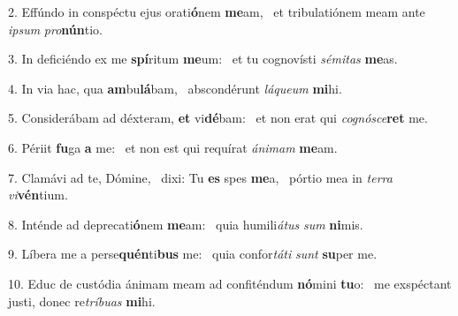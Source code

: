 2. Effúndo in conspéctu ejus orati\textbf{ó}nem \textbf{me}am, \ast\  et tribulatiónem meam ante \textit{ip}\textit{sum} \textit{pro}\textbf{nún}tio.\

3. In deficiéndo ex me \textbf{spí}ritum \textbf{me}um: \ast\  et tu cognovísti \textit{sé}\textit{mi}\textit{tas} \textbf{me}as.\

4. In via hac, qua \textbf{am}bu\textbf{lá}bam, \ast\  abscondérunt \textit{lá}\textit{que}\textit{um} \textbf{mi}hi.\

5. Considerábam ad déxteram, \textbf{et} vi\textbf{dé}bam: \ast\  et non erat qui \textit{co}\textit{gnó}\textit{sce}\textbf{ret} me.\

6. Périit \textbf{fu}ga \textbf{a} me: \ast\  et non est qui requírat \textit{á}\textit{ni}\textit{mam} \textbf{me}am.\

7. Clamávi ad te, Dómine, \dag\  dixi: Tu \textbf{es} spes \textbf{me}a, \ast\  pórtio mea in \textit{ter}\textit{ra} \textit{vi}\textbf{vén}tium.\

8. Inténde ad deprecati\textbf{ó}nem \textbf{me}am: \ast\  quia humili\textit{á}\textit{tus} \textit{sum} \textbf{ni}mis.\

9. Líbera me a perse\textbf{quén}ti\textbf{bus} me: \ast\  quia confor\textit{tá}\textit{ti} \textit{sunt} \textbf{su}per me.\

10. Educ de custódia ánimam meam ad confiténdum \textbf{nó}mini \textbf{tu}o: \ast\  me exspéctant justi, donec re\textit{trí}\textit{bu}\textit{as} \textbf{mi}hi.\

